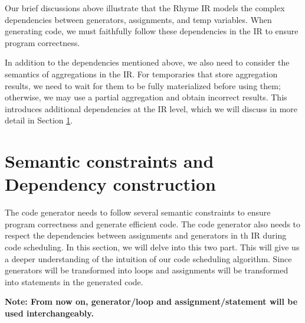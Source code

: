 \documentclass[sigplan, nonacm]{acmart}\settopmatter{printfolios=true,printccs=false,printacmref=false}
\begin{document}
Our brief discussions above illustrate that the Rhyme IR models the complex dependencies between generators, assignments, and temp variables. When generating code, we must faithfully follow these dependencies in the IR to ensure program correctness.\par

In addition to the dependencies mentioned above, we also need to consider the semantics of aggregations in the IR. For temporaries that store aggregation results, we need to wait for them to be fully materialized before using them; otherwise, we may use a partial aggregation and obtain incorrect results. This introduces additional dependencies at the IR level, which we will discuss in more detail in Section \ref{buildeps}.
\section{Semantic constraints and Dependency construction}\label{buildeps}
\iffalse
The code generator needs to follow several semantic constraints to ensure program correctness and generate efficient code. The code generator also needs to respect the dependencies between assignments and generators in th IR during code scheduling. In this section, we will delve into this two part. This will give us a deeper understanding of the intuition of our code scheduling algorithm. Since generators will be transformed into loops and assignments will be transformed into statements in the generated code. \par\textbf{Note: From now on, generator/loop and assignment/statement will be used interchangeably.}
\end{document}
